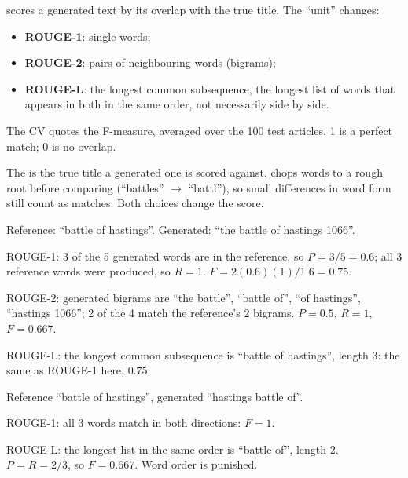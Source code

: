 \begin{definition}
 scores a generated text by its overlap with the true title. The ``unit'' changes:
\begin{itemize}
  \item \textbf{ROUGE-1}: single words;
  \item \textbf{ROUGE-2}: pairs of neighbouring words (bigrams);
  \item \textbf{ROUGE-L}: the longest common subsequence, the longest list of words that appears in both in the same order, not necessarily side by side.
\end{itemize}
The CV quotes the F-measure, averaged over the 100 test articles. 1 is a perfect match; 0 is no overlap.
\end{definition}

\begin{definition}
The  is the true title a generated one is scored against.  chops words to a rough root before comparing (``battles'' $\to$ ``battl''), so small differences in word form still count as matches. Both choices change the score.
\end{definition}

\begin{example}
Reference: ``battle of hastings''. Generated: ``the battle of hastings 1066''.
\begin{steps}
  \item ROUGE-1: 3 of the 5 generated words are in the reference, so $P = 3/5 = 0.6$; all 3 reference words were produced, so $R = 1$. $F = 2(0.6)(1)/1.6 = 0.75$.
  \item ROUGE-2: generated bigrams are ``the battle'', ``battle of'', ``of hastings'', ``hastings 1066''; 2 of the 4 match the reference's 2 bigrams. $P = 0.5$, $R = 1$, $F = 0.667$.
  \item ROUGE-L: the longest common subsequence is ``battle of hastings'', length 3: the same as ROUGE-1 here, $0.75$.
\end{steps}
\end{example}

\begin{example}
Reference ``battle of hastings'', generated ``hastings battle of''.
\begin{steps}
  \item ROUGE-1: all 3 words match in both directions: $F = 1$.
  \item ROUGE-L: the longest list in the same order is ``battle of'', length 2. $P = R = 2/3$, so $F = 0.667$. Word order is punished.
\end{steps}
\end{example}

